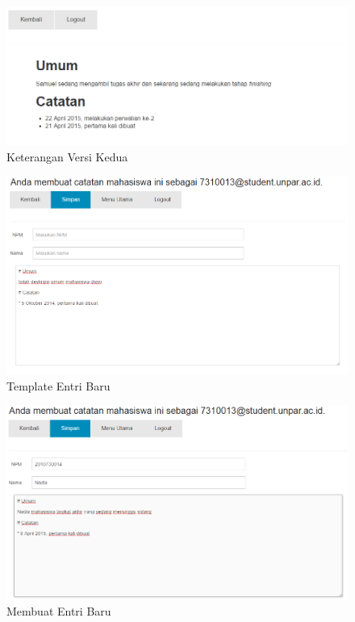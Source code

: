 \begin{figure}[H]
\centering
\includegraphics[scale=0.5]{Gambar/pengujian13.png}
\caption[Keterangan Versi Kedua]{Keterangan Versi Kedua} 
\label{fig:keteranganversikedua}
\end{figure}

\begin{figure}[H]
\centering
\includegraphics[scale=0.5]{Gambar/pengujian14.png}
\caption[Template Entri Baru]{Template Entri Baru} 
\label{fig:templateentribaru}
\end{figure}

\begin{figure}[H]
\centering
\includegraphics[scale=0.5]{Gambar/pengujian15.png}
\caption[Membuat Entri Baru]{Membuat Entri Baru} 
\label{fig:membuatentribaru}
\end{figure}

